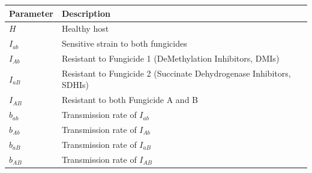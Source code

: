 \documentclass{report}
\begin{document}
\begin{center}
    \label{tab:strain genotypes}
    \begin{tabular}{ll}
        \toprule
        \textbf{Parameter} & \textbf{Description}\\
        \midrule
        $H$      & Healthy host\\
        $I_{ab}$ & Sensitive strain to both fungicides\\
        $I_{Ab}$ & Resistant to Fungicide 1 (DeMethylation Inhibitors, DMIs)\\
        $I_{aB}$ & Resistant to Fungicide 2 (Succinate Dehydrogenase Inhibitors, SDHIs)\\
        $I_{AB}$ & Resistant to both Fungicide A and B\\
        \midrule
        $b_{ab}$ & Transmission rate of $I_{ab}$\\
        $b_{Ab}$ & Transmission rate of $I_{Ab}$\\
        $b_{aB}$ & Transmission rate of $I_{aB}$\\
        $b_{AB}$ & Transmission rate of $I_{AB}$\\
        \bottomrule
    \end{tabular}
\end{center}
\end{document}

